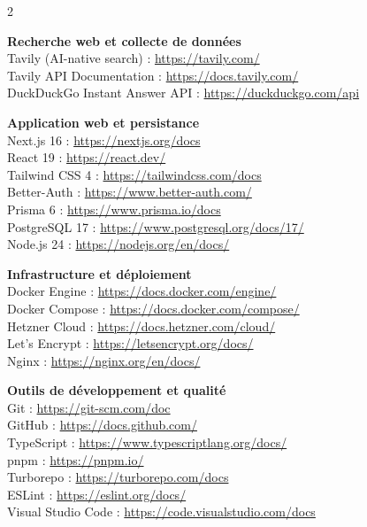 \documentclass[12pt,a4paper,openany]{report}
\begin{document}
\begin{multicols}{2}
\vspace{0.3cm}

\textbf{\color{ensaBlue}Recherche web et collecte de données}\\
Tavily (AI-native search) : \url{https://tavily.com/}\\
Tavily API Documentation : \url{https://docs.tavily.com/}\\
DuckDuckGo Instant Answer API : \url{https://duckduckgo.com/api}

\vspace{0.3cm}

\textbf{\color{ensaBlue}Application web et persistance}\\
Next.js 16 : \url{https://nextjs.org/docs}\\
React 19 : \url{https://react.dev/}\\
Tailwind CSS 4 : \url{https://tailwindcss.com/docs}\\
Better-Auth : \url{https://www.better-auth.com/}\\
Prisma 6 : \url{https://www.prisma.io/docs}\\
PostgreSQL 17 : \url{https://www.postgresql.org/docs/17/}\\
Node.js 24 : \url{https://nodejs.org/en/docs/}

\vspace{0.3cm}

\textbf{\color{ensaBlue}Infrastructure et déploiement}\\
Docker Engine : \url{https://docs.docker.com/engine/}\\
Docker Compose : \url{https://docs.docker.com/compose/}\\
Hetzner Cloud : \url{https://docs.hetzner.com/cloud/}\\
Let's Encrypt : \url{https://letsencrypt.org/docs/}\\
Nginx : \url{https://nginx.org/en/docs/}

\vspace{0.3cm}

\textbf{\color{ensaBlue}Outils de développement et qualité}\\
Git : \url{https://git-scm.com/doc}\\
GitHub : \url{https://docs.github.com/}\\
TypeScript : \url{https://www.typescriptlang.org/docs/}\\
pnpm : \url{https://pnpm.io/}\\
Turborepo : \url{https://turborepo.com/docs}\\
ESLint : \url{https://eslint.org/docs/}\\
Visual Studio Code : \url{https://code.visualstudio.com/docs}


\end{multicols}
\end{document}
